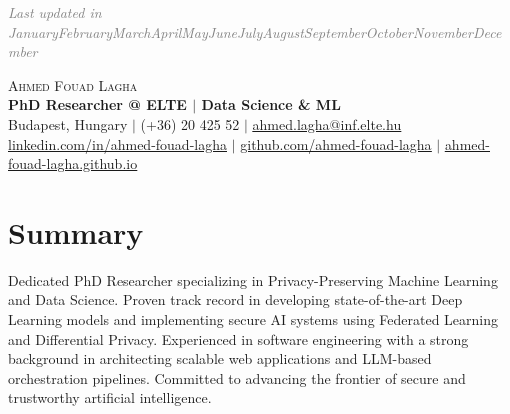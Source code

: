 \documentclass[letterpaper,11pt]{article}
\newcommand{\monthyear}{%
  \ifcase\month\or January\or February\or March\or April\or May\or June\or July\or August\or September\or October\or November\or December\fi \space \number\year
}
\begin{document}
\hfill \textcolor{gray}{\small \textit{Last updated in \monthyear \hspace{1pt} \faHistory}}

\vspace{-15pt}

\begin{center}
    {\Huge \scshape Ahmed Fouad Lagha} \\ \vspace{5pt}
    \textbf{\Large PhD Researcher @ ELTE $|$ Data Science \& ML} \\ \vspace{5pt}
    \small 
    \faMapMarker* \hspace{0.5pt} Budapest, Hungary \hspace{5pt} $|$ \hspace{5pt}
    \faPhone \hspace{0.5pt} (+36) 20 425 52 \hspace{5pt} $|$ \hspace{5pt}
    \faEnvelope \hspace{0.5pt} \href{mailto:ahmed.lagha@inf.elte.hu}{\underline{ahmed.lagha@inf.elte.hu}} \\ \vspace{3pt}
    \faLinkedin \hspace{0.5pt} \href{https://linkedin.com/in/ahmed-fouad-lagha}{\underline{linkedin.com/in/ahmed-fouad-lagha}} \hspace{3pt} $|$ \hspace{3pt}
    \faGithub \hspace{0.5pt} \href{https://github.com/ahmed-fouad-lagha}{\underline{github.com/ahmed-fouad-lagha}} \hspace{3pt} $|$ \hspace{3pt}
    \faGlobe \hspace{0.5pt} \href{https://ahmed-fouad-lagha.github.io/}{\underline{ahmed-fouad-lagha.github.io}}
\end{center}

\vspace{-15pt}

\section{Summary}
 {
  Dedicated PhD Researcher specializing in Privacy-Preserving Machine Learning and Data Science. Proven track record in developing state-of-the-art Deep Learning models and implementing secure AI systems using Federated Learning and Differential Privacy. Experienced in software engineering with a strong background in architecting scalable web applications and LLM-based orchestration pipelines. Committed to advancing the frontier of secure and trustworthy artificial intelligence.
 }
\end{document}
